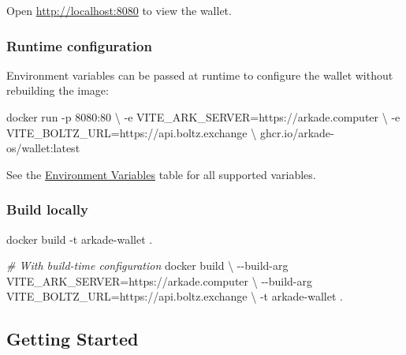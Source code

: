 \documentclass[
]{article}
\newenvironment{Shaded}{}{}
\newcommand{\AttributeTok}[1]{\textcolor[rgb]{0.49,0.56,0.16}{#1}}
\newcommand{\CommentTok}[1]{\textcolor[rgb]{0.38,0.63,0.69}{\textit{#1}}}
\newcommand{\DataTypeTok}[1]{\textcolor[rgb]{0.56,0.13,0.00}{#1}}
\newcommand{\ExtensionTok}[1]{#1}
\newcommand{\NormalTok}[1]{#1}
\begin{document}
Open \url{http://localhost:8080} to view the wallet.

\hypertarget{runtime-configuration}{%
\subsubsection{Runtime configuration}\label{runtime-configuration}}

Environment variables can be passed at runtime to configure the wallet
without rebuilding the image:

\begin{Shaded}
\begin{Highlighting}[]
\ExtensionTok{docker}\NormalTok{ run }\AttributeTok{{-}p}\NormalTok{ 8080:80 }\DataTypeTok{\textbackslash{}}
  \AttributeTok{{-}e}\NormalTok{ VITE\_ARK\_SERVER=https://arkade.computer }\DataTypeTok{\textbackslash{}}
  \AttributeTok{{-}e}\NormalTok{ VITE\_BOLTZ\_URL=https://api.boltz.exchange }\DataTypeTok{\textbackslash{}}
\NormalTok{  ghcr.io/arkade{-}os/wallet:latest}
\end{Highlighting}
\end{Shaded}

See the \protect\hyperlink{environment-variables}{Environment Variables}
table for all supported variables.

\hypertarget{build-locally}{%
\subsubsection{Build locally}\label{build-locally}}

\begin{Shaded}
\begin{Highlighting}[]
\ExtensionTok{docker}\NormalTok{ build }\AttributeTok{{-}t}\NormalTok{ arkade{-}wallet .}

\CommentTok{\# With build{-}time configuration}
\ExtensionTok{docker}\NormalTok{ build }\DataTypeTok{\textbackslash{}}
  \AttributeTok{{-}{-}build{-}arg}\NormalTok{ VITE\_ARK\_SERVER=https://arkade.computer }\DataTypeTok{\textbackslash{}}
  \AttributeTok{{-}{-}build{-}arg}\NormalTok{ VITE\_BOLTZ\_URL=https://api.boltz.exchange }\DataTypeTok{\textbackslash{}}
  \AttributeTok{{-}t}\NormalTok{ arkade{-}wallet .}
\end{Highlighting}
\end{Shaded}

\hypertarget{getting-started}{%
\subsection{Getting Started}\label{getting-started}}
\end{document}
